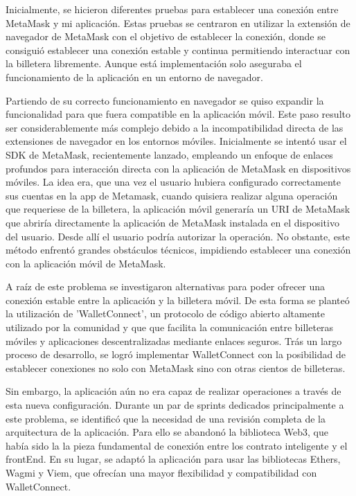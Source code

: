 Inicialmente, se hicieron diferentes pruebas para establecer una conexión entre MetaMask y mi aplicación. Estas pruebas se centraron en utilizar la extensión de navegador de MetaMask con el objetivo de establecer la conexión, donde se consiguió establecer una conexión estable y continua permitiendo interactuar con la billetera libremente. Aunque está implementación solo aseguraba el funcionamiento de la aplicación en un entorno de navegador.

Partiendo de su correcto funcionamiento en navegador se quiso expandir la funcionalidad para que fuera compatible en la aplicación móvil.
Este paso resulto ser considerablemente más complejo debido a la incompatibilidad directa de las extensiones de navegador en los entornos móviles. 
Inicialmente se intentó usar el SDK de MetaMask, recientemente lanzado, empleando un enfoque de enlaces profundos para interacción directa con la aplicación de MetaMask en dispositivos móviles.
La idea era, que una vez el usuario hubiera configurado correctamente sus cuentas en la app de Metamask, cuando quisiera realizar alguna operación que requeriese de la billetera, la aplicación móvil generaría un URI de MetaMask que abriría directamente la aplicación de MetaMask instalada en el dispositivo del usuario. Desde allí el usuario podría autorizar la operación.
No obstante, este método enfrentó grandes obstáculos técnicos, impidiendo establecer una conexión con la aplicación móvil de MetaMask.

A raíz de este problema se investigaron alternativas para poder ofrecer una conexión estable entre la aplicación y la billetera móvil. De esta forma se planteó la utilización de 'WalletConnect', un protocolo de código abierto altamente utilizado por la comunidad y que que facilita la comunicación entre billeteras móviles y aplicaciones descentralizadas mediante enlaces seguros. Trás un largo proceso de desarrollo, se logró implementar WalletConnect con la posibilidad de establecer conexiones no solo con MetaMask sino con otras cientos de billeteras.

Sin embargo, la aplicación aún no era capaz de realizar operaciones a través de esta nueva configuración. Durante un par de sprints dedicados principalmente a este problema, se identificó que la necesidad de una revisión completa de la arquitectura de la aplicación. 
Para ello se abandonó la biblioteca Web3, que había sido la la pieza fundamental de conexión entre los contrato inteligente y el frontEnd.
En su lugar, se adaptó la aplicación para usar las bibliotecas Ethers, Wagmi y Viem, que ofrecían una mayor flexibilidad y compatibilidad con WalletConnect.

